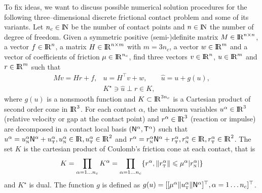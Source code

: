 To fix ideas, we want to discuss possible numerical solution procedures for the following three--dimensional discrete frictional contact problem and some of its variants.  Let $n_c\in \mathrm{I\!N}$ be the number of contact points and $n\in\mathrm{I\!N}$ the number of degree of freedom. Given a symmetric positive (semi-)definite matrix ${M} \in \mathrm{I\!R}^{n \times n}$, a vector $ {f} \in \mathrm{I\!R}^n$, a matrix  ${H} \in \mathrm{I\!R}^{n \times m}$ with $m= 3n_c$, a vector $w \in \mathrm{I\!R}^{m}$ and a vector of coefficients of friction $\mu \in \mathrm{I\!R}^{n_c}$, find three vectors $ {v} \in \mathrm{I\!R}^n$, $u\in\mathrm{I\!R}^m$ and $r\in \mathrm{I\!R}^m$ such that
\begin{equation}\label{eq:soccp1}
  \begin{array}{rcl}
    M v = {H} {r} + {f}, &
    u = H^\top v + w,  &
    \hat u = u + g(u) ,\\[1mm]
    &    K^\star \ni {\hat u} \perp r \in K,&
  \end{array}
\end{equation}
where $g(u)$ is a nonsmooth function and $K\subset \mathrm{I\!R}^{3 n_c}$ is a Cartesian product of second order cone in $\mathrm{I\!R}^3$.   For each contact $\alpha$, the unknown variables  $u^\alpha\in\mathrm{I\!R}^3$ (relative velocity or gap at the contact point) and $r^\alpha\in\mathrm{I\!R}^3$ (reaction or impulse) are decomposed  in a contact local basis $({\sf N}^\alpha,{\sf T}^\alpha)$ such that $u^\alpha = u^\alpha_{{\hbox{\tiny{N}}}} {\sf N}^\alpha +   u^{\alpha}_{{\hbox{\tiny{T}}}}, u^\alpha_{{\hbox{\tiny{N}}}} \in \mathrm{I\!R}, u^\alpha_{{\hbox{\tiny{T}}}} \in \mathrm{I\!R}^2$ and  $r^\alpha = r^\alpha_{{\hbox{\tiny{N}}}} {\sf N}^\alpha +   r^{\alpha}_{{\hbox{\tiny{T}}}}, r^\alpha_{{\hbox{\tiny{N}}}} \in \mathrm{I\!R}, r^\alpha_{{\hbox{\tiny{T}}}} \in \mathrm{I\!R}^2$.
The set $K$ is the cartesian product of Coulomb's friction cone at each contact, that is
\begin{equation}
  \label{eq:CC}
  K = \prod_{\alpha=1\ldots n_c} K^{\alpha}  = \prod_{\alpha=1\ldots n_c} \{r^\alpha, \|r^\alpha_\t \| \leq \mu^\alpha |r^\alpha_\n| \}
\end{equation}
and $K^\star$ is dual.
The function $g$ is defined as $g(u) = [[\mu^\alpha  \|u^\alpha_{\hbox{\tiny{T}}}\| {\sf N}^\alpha]^\top, \alpha = 1\ldots n_c]^\top$.

